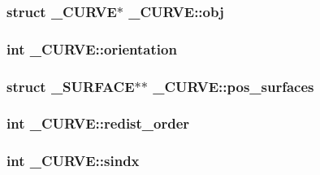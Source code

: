 \subsubsection[{\texorpdfstring{obj}{obj}}]{\setlength{\rightskip}{0pt plus 5cm}struct {\bf \+\_\+\+C\+U\+R\+VE}$\ast$ \+\_\+\+C\+U\+R\+V\+E\+::obj}\hypertarget{struct___c_u_r_v_e_a6855eb3d75e2608deadb9770fe8e740d}{}\label{struct___c_u_r_v_e_a6855eb3d75e2608deadb9770fe8e740d}
\subsubsection[{\texorpdfstring{orientation}{orientation}}]{\setlength{\rightskip}{0pt plus 5cm}int \+\_\+\+C\+U\+R\+V\+E\+::orientation}\hypertarget{struct___c_u_r_v_e_ada56d354d3f3db6ea57fb86029d24362}{}\label{struct___c_u_r_v_e_ada56d354d3f3db6ea57fb86029d24362}
\subsubsection[{\texorpdfstring{pos\+\_\+surfaces}{pos_surfaces}}]{\setlength{\rightskip}{0pt plus 5cm}struct {\bf \+\_\+\+S\+U\+R\+F\+A\+CE}$\ast$$\ast$ \+\_\+\+C\+U\+R\+V\+E\+::pos\+\_\+surfaces}\hypertarget{struct___c_u_r_v_e_ab018f6447781988f64737b1e669fe237}{}\label{struct___c_u_r_v_e_ab018f6447781988f64737b1e669fe237}
\subsubsection[{\texorpdfstring{redist\+\_\+order}{redist_order}}]{\setlength{\rightskip}{0pt plus 5cm}int \+\_\+\+C\+U\+R\+V\+E\+::redist\+\_\+order}\hypertarget{struct___c_u_r_v_e_afc528feba44b761b3cc7977e55c1e7f5}{}\label{struct___c_u_r_v_e_afc528feba44b761b3cc7977e55c1e7f5}
\subsubsection[{\texorpdfstring{sindx}{sindx}}]{\setlength{\rightskip}{0pt plus 5cm}int \+\_\+\+C\+U\+R\+V\+E\+::sindx}\hypertarget{struct___c_u_r_v_e_a40efbaf6548b826fece6e6ddd0a12eca}{}\label{struct___c_u_r_v_e_a40efbaf6548b826fece6e6ddd0a12eca}
